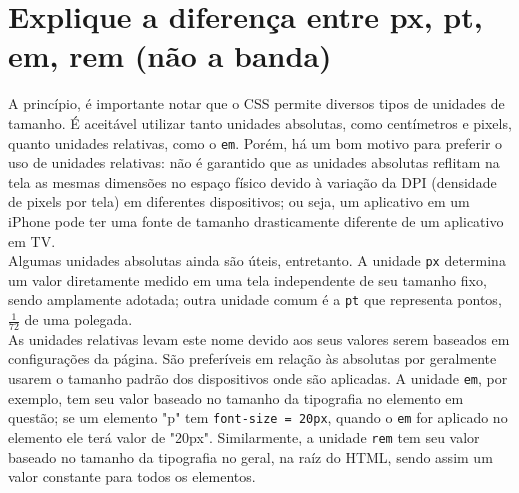 \section{Explique a diferença entre px, pt, em, rem (não a banda)}

A princípio, é importante notar que o CSS permite diversos tipos de unidades de tamanho. É aceitável utilizar tanto unidades absolutas, como centímetros e pixels, quanto unidades relativas, como o \texttt{em}. Porém, há um bom motivo para preferir o uso de unidades relativas: não é garantido que as unidades absolutas reflitam na tela as mesmas dimensões no espaço físico devido à variação da DPI (densidade de pixels por tela) em diferentes dispositivos; ou seja, um aplicativo em um iPhone pode ter uma fonte de tamanho drasticamente diferente de um aplicativo em TV. \\

Algumas unidades absolutas ainda são úteis, entretanto. A unidade \texttt{px} determina um valor diretamente medido em uma tela independente de seu tamanho fixo, sendo amplamente adotada; outra unidade comum é a \texttt{pt} que representa pontos, $\frac{1}{72}$ de uma polegada. \\

As unidades relativas levam este nome devido aos seus valores serem baseados em configurações da página. São preferíveis em relação às absolutas por geralmente usarem o tamanho padrão dos dispositivos onde são aplicadas. A unidade \texttt{em}, por exemplo, tem seu valor baseado no tamanho da tipografia no elemento em questão; se um elemento "p" tem \texttt{font-size = 20px}, quando o \texttt{em} for aplicado no elemento ele terá valor de "20px". Similarmente, a unidade \texttt{rem} tem seu valor baseado no tamanho da tipografia no geral, na raíz do HTML, sendo assim um valor constante para todos os elementos.
